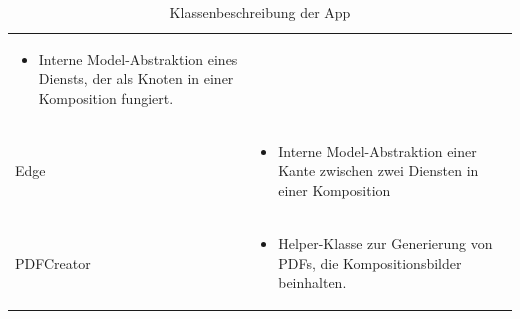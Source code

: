 \begin{table}[h]
\begin{tabularx}{\textwidth}{p{} X}
\begin{itemize}
		\item Interne Model-Abstraktion eines Diensts, der als Knoten in einer Komposition fungiert. 
		\end{itemize}\\
		\rowcolor[HTML]{E7E7E7} 
		Edge & \begin{itemize}
				 \item Interne Model-Abstraktion einer Kante zwischen zwei Diensten in einer Komposition 
				 \end{itemize} \\
		PDFCreator & \begin{itemize}
\item Helper-Klasse zur Generierung von PDFs, die Kompositionsbilder beinhalten. \end{itemize}\\	\end{tabularx}
	\caption{Klassenbeschreibung der App}
	\label{table:klassenbeschreibung-a}
\end{table}

